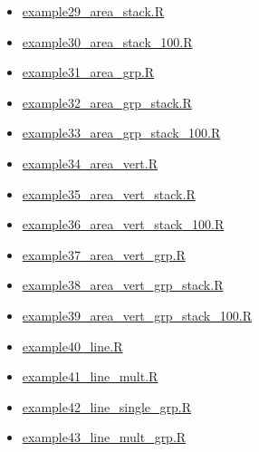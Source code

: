\documentclass[letterpaper,10pt,english]{sphinxmanual}
\begin{document}
{\begin{minipage}{0.95\linewidth}
\begin{itemize}
\item {} 
{\hyperref[dimple/gallery:example29-area-stack-r]{example29\_area\_stack.R}}

\item {} 
{\hyperref[dimple/gallery:example30-area-stack-100-r]{example30\_area\_stack\_100.R}}

\item {} 
{\hyperref[dimple/gallery:example31-area-grp-r]{example31\_area\_grp.R}}

\item {} 
{\hyperref[dimple/gallery:example32-area-grp-stack-r]{example32\_area\_grp\_stack.R}}

\item {} 
{\hyperref[dimple/gallery:example33-area-grp-stack-100-r]{example33\_area\_grp\_stack\_100.R}}

\item {} 
{\hyperref[dimple/gallery:example34-area-vert-r]{example34\_area\_vert.R}}

\item {} 
{\hyperref[dimple/gallery:example35-area-vert-stack-r]{example35\_area\_vert\_stack.R}}

\item {} 
{\hyperref[dimple/gallery:example36-area-vert-stack-100-r]{example36\_area\_vert\_stack\_100.R}}

\item {} 
{\hyperref[dimple/gallery:example37-area-vert-grp-r]{example37\_area\_vert\_grp.R}}

\item {} 
{\hyperref[dimple/gallery:example38-area-vert-grp-stack-r]{example38\_area\_vert\_grp\_stack.R}}

\item {} 
{\hyperref[dimple/gallery:example39-area-vert-grp-stack-100-r]{example39\_area\_vert\_grp\_stack\_100.R}}

\item {} 
{\hyperref[dimple/gallery:example40-line-r]{example40\_line.R}}

\item {} 
{\hyperref[dimple/gallery:example41-line-mult-r]{example41\_line\_mult.R}}

\item {} 
{\hyperref[dimple/gallery:example42-line-single-grp-r]{example42\_line\_single\_grp.R}}

\item {} 
{\hyperref[dimple/gallery:example43-line-mult-grp-r]{example43\_line\_mult\_grp.R}}


\end{itemize}
\end{minipage}}
\end{document}
